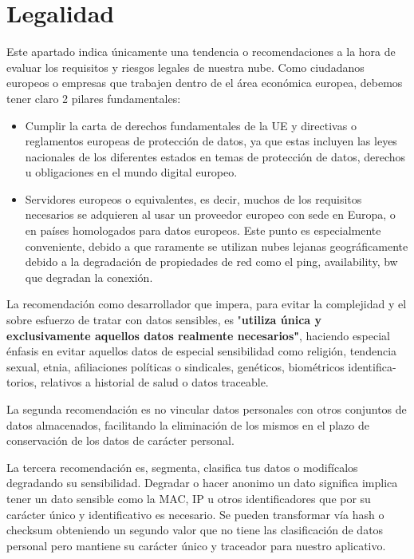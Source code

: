 \section{Legalidad}
Este apartado indica únicamente una tendencia o recomendaciones a la hora de evaluar los requisitos y riesgos legales de nuestra nube. Como ciudadanos europeos o empresas que trabajen dentro de el área económica europea, debemos tener claro 2 pilares fundamentales:
\begin{itemize}
    
    \item Cumplir la carta de derechos fundamentales de la UE y directivas o reglamentos europeas de protección de datos\cite{c_ue_rpgd}, ya que estas incluyen las leyes nacionales\cite{c_boe_rpgd} de los diferentes estados en temas de protección de datos, derechos u obligaciones en el mundo digital europeo.
    
    \item Servidores europeos o equivalentes, es decir, muchos de los requisitos necesarios se adquieren al usar un proveedor europeo con sede en Europa, o en países homologados para datos europeos. Este punto es especialmente conveniente, debido a que raramente se utilizan nubes lejanas geográficamente debido a la degradación de propiedades de red como el ping, availability, bw que degradan la conexión.
    
\end{itemize}

La recomendación como desarrollador que impera, para evitar la complejidad y el sobre esfuerzo de tratar con datos sensibles, es "\textbf{utiliza única y exclusivamente aquellos datos realmente necesarios"}, haciendo especial énfasis en evitar aquellos datos de especial sensibilidad como religión, tendencia sexual, etnia, afiliaciones políticas o sindicales, genéticos, biométricos identifica-torios, relativos a historial de salud o datos traceable.

La segunda recomendación es no vincular datos personales con otros conjuntos de datos almacenados, facilitando la eliminación de los mismos en el plazo de conservación de los datos de carácter personal.

La tercera recomendación es, segmenta, clasifica tus datos o modifícalos degradando su sensibilidad. Degradar o hacer anonimo un dato significa implica tener un dato sensible como la MAC, IP u otros identificadores que por su carácter único y identificativo es necesario. Se pueden transformar vía hash o checksum obteniendo un segundo valor que no tiene las clasificación de datos personal pero mantiene su carácter único y traceador para nuestro aplicativo.  

